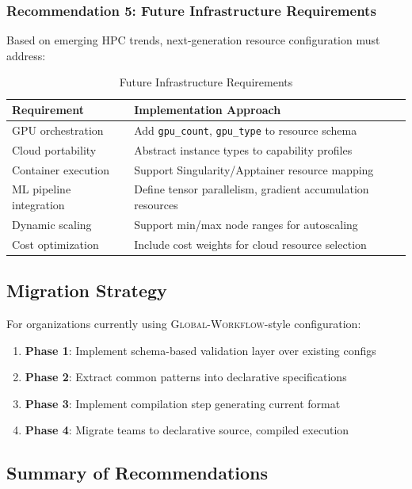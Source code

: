 \documentclass[11pt,twoside]{article}
\newcommand{\gw}{\textsc{Global-Workflow}}
\begin{document}
\subsubsection{Recommendation 5: Future Infrastructure Requirements}

Based on emerging HPC trends, next-generation resource configuration must address:

\begin{table}[H]
\centering
\caption{Future Infrastructure Requirements}
\label{tab:future}
\begin{tabular}{@{}lp{8cm}@{}}
\toprule
\textbf{Requirement} & \textbf{Implementation Approach} \\
\midrule
GPU orchestration & Add \texttt{gpu\_count}, \texttt{gpu\_type} to resource schema \\
Cloud portability & Abstract instance types to capability profiles \\
Container execution & Support Singularity/Apptainer resource mapping \\
ML pipeline integration & Define tensor parallelism, gradient accumulation resources \\
Dynamic scaling & Support min/max node ranges for autoscaling \\
Cost optimization & Include cost weights for cloud resource selection \\
\bottomrule
\end{tabular}
\end{table}

\subsection{Migration Strategy}

For organizations currently using \gw{}-style configuration:

\begin{enumerate}[leftmargin=2em]
    \item \textbf{Phase 1}: Implement schema-based validation layer over existing configs
    \item \textbf{Phase 2}: Extract common patterns into declarative specifications
    \item \textbf{Phase 3}: Implement compilation step generating current format
    \item \textbf{Phase 4}: Migrate teams to declarative source, compiled execution
\end{enumerate}

\subsection{Summary of Recommendations}
\end{document}
